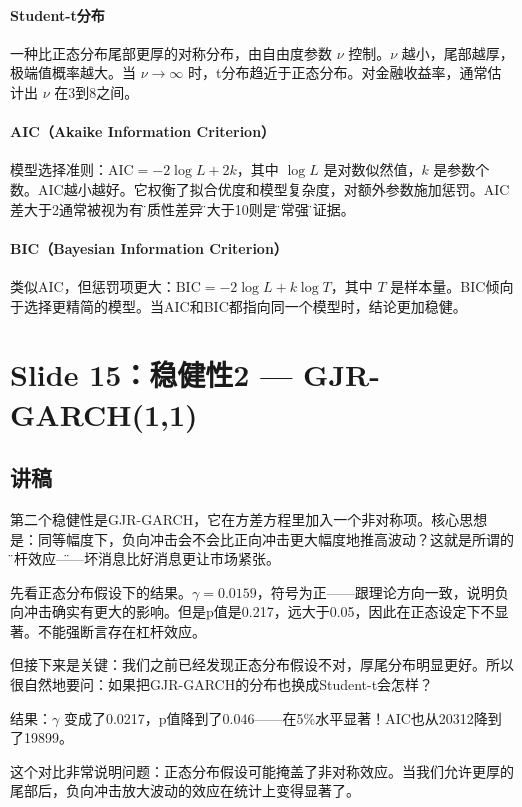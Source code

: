 \documentclass[11pt,a4paper]{article}
\begin{document}
\paragraph{Student-t分布} 一种比正态分布尾部更厚的对称分布，由自由度参数 \(\nu\) 控制。\(\nu\) 越小，尾部越厚，极端值概率越大。当 \(\nu \to \infty\) 时，t分布趋近于正态分布。对金融收益率，通常估计出 \(\nu\) 在3到8之间。

\paragraph{AIC（Akaike Information Criterion）} 模型选择准则：\(\text{AIC} = -2\log L + 2k\)，其中 \(\log L\) 是对数似然值，\(k\) 是参数个数。AIC越小越好。它权衡了拟合优度和模型复杂度，对额外参数施加惩罚。AIC差大于2通常被视为有\"实质性差异\"，大于10则是\"非常强\"的证据。

\paragraph{BIC（Bayesian Information Criterion）} 类似AIC，但惩罚项更大：\(\text{BIC} = -2\log L + k\log T\)，其中 \(T\) 是样本量。BIC倾向于选择更精简的模型。当AIC和BIC都指向同一个模型时，结论更加稳健。

\newpage
\section*{Slide 15：稳健性2 — GJR-GARCH(1,1)}

\subsection*{讲稿}
第二个稳健性是GJR-GARCH，它在方差方程里加入一个非对称项。核心思想是：同等幅度下，负向冲击会不会比正向冲击更大幅度地推高波动？这就是所谓的\"杠杆效应\"——坏消息比好消息更让市场紧张。

先看正态分布假设下的结果。\(\gamma = 0.0159\)，符号为正——跟理论方向一致，说明负向冲击确实有更大的影响。但是p值是0.217，远大于0.05，因此在正态设定下不显著。不能强断言存在杠杆效应。

但接下来是关键：我们之前已经发现正态分布假设不对，厚尾分布明显更好。所以很自然地要问：如果把GJR-GARCH的分布也换成Student-t会怎样？

结果：\(\gamma\) 变成了0.0217，p值降到了0.046——在5\%水平显著！AIC也从20312降到了19899。

这个对比非常说明问题：正态分布假设可能掩盖了非对称效应。当我们允许更厚的尾部后，负向冲击放大波动的效应在统计上变得显著了。
\end{document}
